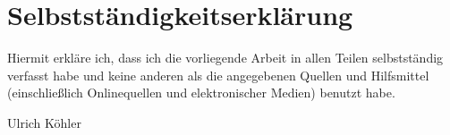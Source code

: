 \documentclass[ngerman,pdftex,paper=A4,DIV=calc,titlepage,12pt]{scrartcl}
\newtheorem[L]{boxedDefinition}{Definition}
\begin{document}
\section{Selbstständigkeitserklärung}
Hiermit erkläre ich, dass ich die vorliegende Arbeit in allen Teilen selbstständig verfasst habe und keine anderen als die angegebenen Quellen und Hilfsmittel (einschließlich Onlinequellen und elektronischer Medien) benutzt habe. 
\vfill
\begin{center}
\underline{\hspace{10cm}}\vspace{1cm}
\end{center}
\begin{center}
Ulrich Köhler
\end{center}
\vfill
\end{document}
